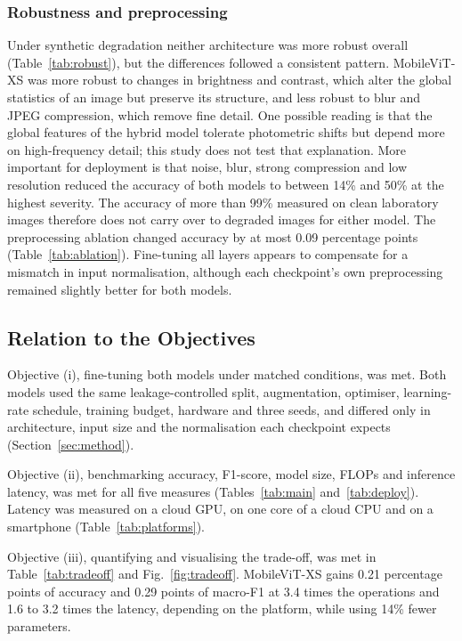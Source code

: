 \documentclass[conference]{IEEEtran}
\begin{document}
\subsubsection{Robustness and preprocessing}
Under synthetic degradation neither architecture was more robust overall (Table~\ref{tab:robust}), but the differences followed a consistent pattern. MobileViT-XS was more robust to changes in brightness and contrast, which alter the global statistics of an image but preserve its structure, and less robust to blur and JPEG compression, which remove fine detail. One possible reading is that the global features of the hybrid model tolerate photometric shifts but depend more on high-frequency detail; this study does not test that explanation. More important for deployment is that noise, blur, strong compression and low resolution reduced the accuracy of both models to between 14\% and 50\% at the highest severity. The accuracy of more than 99\% measured on clean laboratory images therefore does not carry over to degraded images for either model. The preprocessing ablation changed accuracy by at most 0.09 percentage points (Table~\ref{tab:ablation}). Fine-tuning all layers appears to compensate for a mismatch in input normalisation, although each checkpoint's own preprocessing remained slightly better for both models.

\subsection{Relation to the Objectives}

Objective (i), fine-tuning both models under matched conditions, was met. Both models used the same leakage-controlled split, augmentation, optimiser, learning-rate schedule, training budget, hardware and three seeds, and differed only in architecture, input size and the normalisation each checkpoint expects (Section~\ref{sec:method}).

Objective (ii), benchmarking accuracy, F1-score, model size, FLOPs and inference latency, was met for all five measures (Tables~\ref{tab:main} and~\ref{tab:deploy}). Latency was measured on a cloud GPU, on one core of a cloud CPU and on a smartphone (Table~\ref{tab:platforms}).

Objective (iii), quantifying and visualising the trade-off, was met in Table~\ref{tab:tradeoff} and Fig.~\ref{fig:tradeoff}. MobileViT-XS gains 0.21 percentage points of accuracy and 0.29 points of macro-F1 at 3.4 times the operations and 1.6 to 3.2 times the latency, depending on the platform, while using 14\% fewer parameters.
\end{document}
